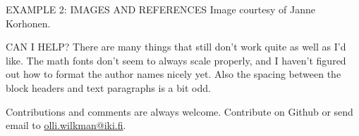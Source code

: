 \documentclass[final]{beamer}
\begin{document}
\begin{frame}[t, fragile]
\begin{columns}[T]
\begin{column}{0.32\linewidth}
\begin{block}{EXAMPLE 2: IMAGES AND REFERENCES}
Image courtesy of Janne Korhonen.
\end{block}

\begin{block}{CAN I HELP?}
There are many things that still don't work quite as well as I'd like. The math fonts don't seem to always scale properly, and I haven't figured out how to format the author names nicely yet. Also the spacing between the block headers and text paragraphs is a bit odd.

Contributions and comments are always welcome. Contribute on Github or send email to \url{olli.wilkman@iki.fi}.
\end{block}
	
\end{column}

\end{columns}
\end{frame}
\end{document}
